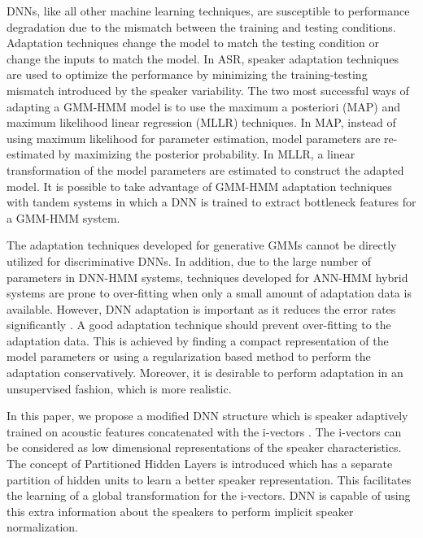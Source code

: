 \documentclass[a4paper]{article}
\begin{document}
    
    DNNs, like all other machine learning techniques, are susceptible to performance degradation due to the mismatch between the training and testing conditions. Adaptation techniques change the model to match the testing condition or change the inputs to match the model. In ASR, speaker adaptation techniques are used to optimize the performance by minimizing the training-testing mismatch introduced by the speaker variability. The two most successful ways of adapting a GMM-HMM model is to use the maximum a posteriori (MAP) \cite{MAP} and maximum likelihood linear regression (MLLR) \cite{MLLR} techniques. In MAP, instead of using maximum likelihood for  parameter estimation, model parameters are re-estimated by maximizing the posterior probability.  In MLLR, a linear transformation of the model parameters are estimated to construct the adapted model. It is possible to take advantage of GMM-HMM adaptation techniques with tandem systems \cite{Tandem}\cite{Tandem2} in which a DNN is trained to extract bottleneck features for a GMM-HMM system. 
    
    The adaptation techniques developed for generative GMMs cannot be directly utilized for discriminative DNNs. In addition, due to the large number of parameters in DNN-HMM systems, techniques developed for ANN-HMM hybrid systems \cite{ANN} are prone to over-fitting when only a small amount of adaptation data is available. However, DNN adaptation is important as it reduces the error rates significantly \cite{KLDNN}\cite{IVECT}\cite{IVECT1}\cite{SPEAKECODE1}.  A good adaptation technique should prevent over-fitting to the adaptation data. This is achieved by finding a compact representation of the model parameters or using a regularization based method to perform the adaptation conservatively.  Moreover, it is desirable to perform adaptation in an unsupervised fashion, which is more realistic.
  
    
    In this paper, we propose a modified DNN structure which is speaker adaptively trained on acoustic features concatenated with the i-vectors \cite{IVECT2}\cite{IVECT3}. The i-vectors can be considered as low dimensional representations of the speaker characteristics. The concept of Partitioned Hidden Layers is introduced which has a separate partition of hidden units to learn a better speaker representation. This facilitates the learning of a global transformation for the i-vectors.  DNN is capable of using this extra information about the speakers to perform implicit speaker normalization.
    
\end{document}
